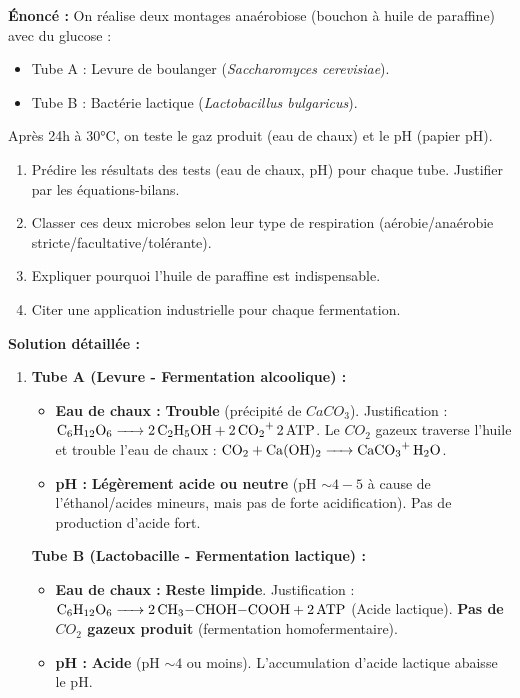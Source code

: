 \documentclass[11pt]{article}
\begin{document}
\begin{exoresolu}
    \textbf{Énoncé :} On réalise deux montages anaérobiose (bouchon à huile de paraffine) avec du glucose :
    \begin{itemize}
        \item Tube A : Levure de boulanger (\emph{Saccharomyces cerevisiae}).
        \item Tube B : Bactérie lactique (\emph{Lactobacillus bulgaricus}).
    \end{itemize}
    Après 24h à 30°C, on teste le gaz produit (eau de chaux) et le pH (papier pH).
    \begin{enumerate}
        \item Prédire les résultats des tests (eau de chaux, pH) pour chaque tube. Justifier par les équations-bilans.
        \item Classer ces deux microbes selon leur type de respiration (aérobie/anaérobie stricte/facultative/tolérante).
        \item Expliquer pourquoi l'huile de paraffine est indispensable.
        \item Citer une application industrielle pour chaque fermentation.
    \end{enumerate}
    \tcblower
    \textbf{Solution détaillée :}
    \begin{enumerate}
        \item \textbf{Tube A (Levure - Fermentation alcoolique) :}
              \begin{itemize}
                  \item \textbf{Eau de chaux :} \textbf{Trouble} (précipité de $CaCO_3$). Justification : $\ce{C6H12O6 -> 2 C2H5OH + 2 CO2+ 2 ATP}$. Le $CO_2$ gazeux traverse l'huile et trouble l'eau de chaux : $\ce{CO2 + Ca(OH)2 -> CaCO3+ H2O}$.
                  \item \textbf{pH :} \textbf{Légèrement acide ou neutre} (pH $\sim 4-5$ à cause de l'éthanol/acides mineurs, mais pas de forte acidification). Pas de production d'acide fort.
              \end{itemize}
              \textbf{Tube B (Lactobacille - Fermentation lactique) :}
              \begin{itemize}
                  \item \textbf{Eau de chaux :} \textbf{Reste limpide}. Justification : $\ce{C6H12O6 -> 2 CH3-CHOH-COOH + 2 ATP}$ (Acide lactique). \textbf{Pas de $CO_2$ gazeux produit} (fermentation homofermentaire).
                  \item \textbf{pH :} \textbf{Acide} (pH $\sim 4$ ou moins). L'accumulation d'acide lactique abaisse le pH.

\end{itemize}
\end{enumerate}
\end{exoresolu}
\end{document}
